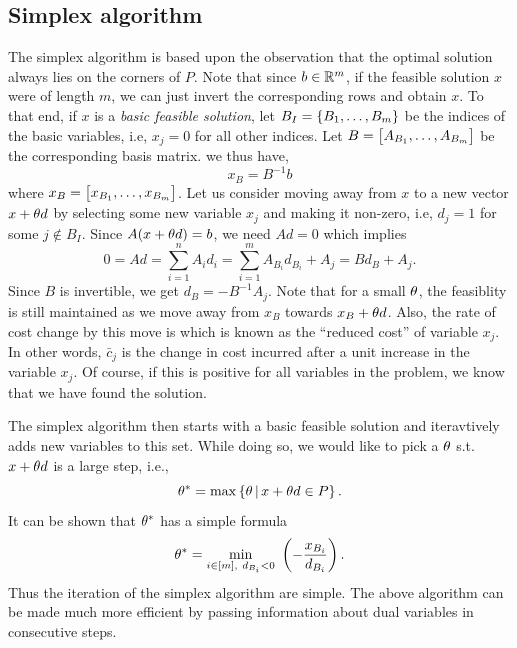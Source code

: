 \documentclass[letterpaper, 10pt, twocolumn, reqno]{amsart}
\begin{document}
\subsection{Simplex algorithm}
\label{ssec:simplex}
The simplex algorithm is based upon the observation that the optimal solution always lies on the corners of $P$. Note that since $b \in \mathbb{R}^m$, if the feasible solution $x$ were of length $m$, we can just invert the corresponding rows and obtain $x$. To that end, if $x$ is a \emph{basic feasible solution}, let $B_I = \left\{B_1, \ldots, B_m\right\}$ be the indices of the basic variables, i.e, $x_j = 0$ for all other indices. Let $B = \begin{bmatrix}A_{B_1}, \ldots, A_{B_m}\end{bmatrix}$ be the corresponding basis matrix. we thus have,
$$
x_B = B^{-1} b
$$
where $x_B = \begin{bmatrix}x_{B_1}, \ldots, x_{B_m}\end{bmatrix}$.
Let us consider moving away from $x$ to a new vector $x + \theta d$ by selecting some new variable $x_j$ and making it non-zero, i.e, $d_j = 1$ for some $j \notin B_I$. Since $A(x+\theta d) = b$, we need $A d = 0$ which implies
$$
0 = A d = \sum_{i=1}^n A_i d_i = \sum_{i=1}^m A_{B_i} d_{B_i} + A_j = B d_B + A_j.
$$
Since $B$ is invertible, we get $d_B = -B^{-1} A_j$. Note that for a small $\theta$, the feasiblity is still maintained as we move away from $x_B$ towards $x_B + \theta d$. Also, the rate of cost change by this move is
which is known as the ``reduced cost'' of variable $x_j$. In other words, $\bar{c}_j$ is the change in cost incurred after a unit increase in the variable $x_j$. Of course, if this is positive for all variables in the problem, we know that we have found the solution.

The simplex algorithm then starts with a basic feasible solution and iteravtively adds new variables to this set. While doing so, we would like to pick a $\theta$ s.t. $x+\theta d$ is a large step, i.e.,
$$
\theta^* = \max \left\{\theta \, \vert \, x + \theta d \in P\right\}.
$$
It can be shown that $\theta^*$ has a simple formula
$$
\th^* = \min_{i \in [m],\ d_{B_i} < 0}\ \rbrac{- \f{x_{B_i}}{d_{B_i}}}.
$$
Thus the iteration of the simplex algorithm are simple.
The above algorithm can be made much more efficient by passing information about dual variables in consecutive steps.
\end{document}
